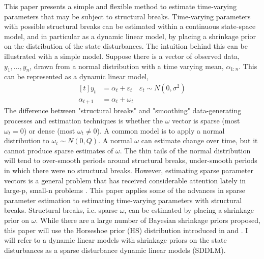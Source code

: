 \documentclass{article}
\begin{document}
This paper presents a simple and flexible method to estimate time-varying parameters that may be subject to structural breaks.
Time-varying parameters with possible structural breaks can be estimated within a continuous state-space model, and in particular as a dynamic linear model, by placing a shrinkage prior on the distribution of the state disturbances.
The intuition behind this can be illustrated with a simple model.
Suppose there is a vector of observed data, $y_{1}, \dots, y_{n}$, drawn from a normal distribution with a time varying mean, $\alpha_{1:n}$. 
This can be represented as a dynamic linear model,
\begin{equation}
  \label{eq:4}
  \begin{aligned}[t]
    y_{t} &= \alpha_{t} + \varepsilon_{t} & \varepsilon_{t} \sim N(0, \sigma^{2}) \\
    \alpha_{t + 1} &= \alpha_{t} + \omega_{t}
  \end{aligned}
\end{equation}
The difference between "structural breaks" and "smoothing" data-generating processes and estimation techniques is whether the $\omega$ vector is sparse (most $\omega_{t} = 0$) or dense (most $\omega_{t} \neq 0$).
A common model is to apply a normal distribution to $\omega_{t} \sim N(0, Q)$.
A normal $\omega$ can estimate change over time, but it cannot produce sparse estimates of $\omega$.
The thin tails of the normal distribution will tend to over-smooth periods around structural breaks, under-smooth periods in which there were no structural breaks.
However, estimating sparse parameter vectors is a general problem that has received considerable attention lately in large-p, small-n problems \parencites{Tibshirani1996}{PolsonScott2010}.
This paper applies some of the advances in sparse parameter estimation to estimating time-varying parameters with structural breaks.
Structural breaks, i.e. sparse $\omega$, can be estimated by placing a shrinkage prior on $\omega$.
While there are a large number of Bayesian shrinkage priors proposed, this paper will use the Horseshoe prior (HS) distribution introduced in \textcites{CarvalhoPolsonScott2009} and \textcite{CarvalhoPolsonScott2010}.
I will refer to a dynamic linear models with shrinkage priors on the state disturbances as a sparse disturbance dynamic linear models (SDDLM).
\end{document}
